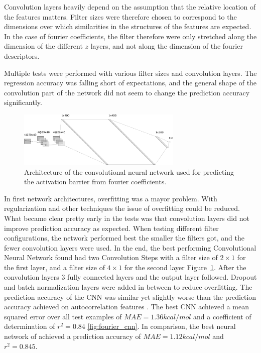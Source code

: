 Convolution layers heavily depend on the assumption that the relative location of the features matters.
Filter sizes were therefore chosen to correspond to the dimensions over which similarities in the structures of the features are expected.
In the case of fourier coefficients, the filter therefore were only stretched along the dimension of the different $z$ layers, and not along the dimension of the fourier descriptors.

Multiple tests were performed with various filter sizes and convolution layers.
The regression accuracy was falling short of expectations, and the general shape of the convolution part of the network did not seem to change the prediction accuracy significantly.

\begin{figure} [h]
    \centering
    \includegraphics[width=0.7\textwidth]{figures/regression/fourier/cnn/fourier_conv_layout.png} 
    \caption[Layout of LEFD CNN]{
        Architecture of the convolutional neural network used for predicting the activation barrier from fourier coefficients.
    }
    \label{fig:cnn-architecture}
\end{figure}

In first network architectures, overfitting was a mayor problem.
With regularization and other techniques the issue of overfitting could be reduced.
What became clear pretty early in the tests was that convolution layers did not improve prediction accuracy as expected.
When testing different filter configurations, the network performed best the smaller the filters got, and the fewer convolution layers were used.
In the end, the best performing Convolutional Neural Network found had two Convolution Steps with a filter size of $2 \times 1$ for the first layer, and a filter size
of $4 \times 1$ for the second layer Figure~\ref{fig:cnn-architecture}.
After the convolution layers 3 fully connected layers and the output layer followed.
Dropout and batch normalization layers were added in between to reduce overfitting.
The prediction accuracy of the CNN was similar yet slightly worse than the prediction accuracy achieved on autocorrelation features \cite{friederich_dos}.
The best CNN achieved a mean squared error over all test examples of $MAE=1.36 kcal/mol$ and a coefficient of determination of $r^2=0.84$ \ref{fig:fourier_cnn}.
In comparison, the best neural network of \cite{friederich_dos} achieved a prediction accuracy of $MAE=1.12 kcal/mol$ and $r^2=0.845$.

